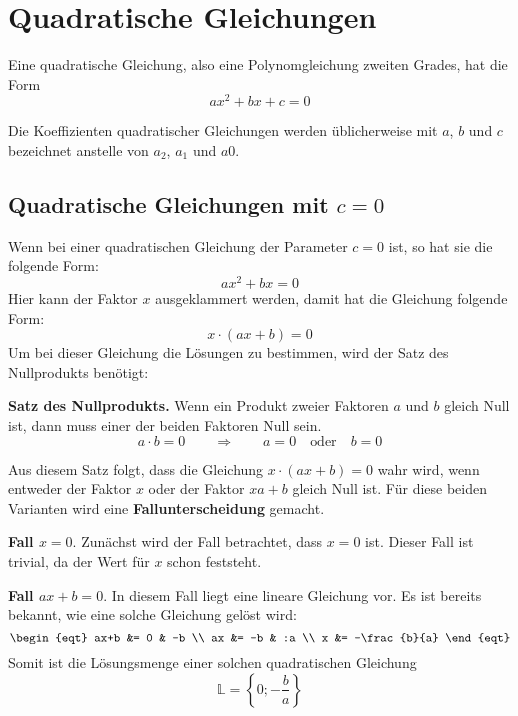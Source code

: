 \newpage
\section{Quadratische Gleichungen}

Eine quadratische Gleichung, also eine Polynomgleichung zweiten Grades, hat die Form
\[
  ax^{2}+bx+c = 0
\]

Die Koeffizienten quadratischer Gleichungen werden üblicherweise mit $a$, $b$ und $c$ bezeichnet anstelle von $a_{2}$, $a_{1}$ und $a{0}$.

\subsection{Quadratische Gleichungen mit $c=0$}

Wenn bei einer quadratischen Gleichung der Parameter $c = 0$ ist, so hat sie die folgende Form:
\[
  ax^{2} + bx = 0
\]
Hier kann der Faktor $x$ ausgeklammert werden, damit hat die Gleichung folgende Form:
\[
  x\cdot(ax+b) = 0
\]
Um bei dieser Gleichung die Lösungen zu bestimmen, wird der Satz des Nullprodukts benötigt:

\begin{theorem}
  \textbf{Satz des Nullprodukts.} Wenn ein Produkt zweier Faktoren $a$ und $b$ gleich Null ist, dann muss einer der beiden Faktoren Null sein.
  \[
    a\cdot b = 0 \qquad\Rightarrow\qquad a = 0 \quad\text{oder}\quad b = 0
  \]
\end{theorem}

Aus diesem Satz folgt, dass die Gleichung $x\cdot(ax+b) = 0$ wahr wird, wenn entweder der Faktor $x$ oder der Faktor $xa+b$ gleich Null ist. Für diese beiden Varianten wird eine \textbf{Fallunterscheidung} gemacht.

\textbf{Fall $x = 0$}. Zunächst wird der Fall betrachtet, dass $x = 0$ ist. Dieser Fall ist trivial, da der Wert für $x$ schon feststeht.

\textbf{Fall $ax+b = 0$}. In diesem Fall liegt eine lineare Gleichung vor. Es ist bereits bekannt, wie eine solche Gleichung gelöst wird:
\[\begin{eqt}
  ax+b &= 0            & -b \\
    ax &= -b           & :a \\
     x &= -\frac{b}{a}
\end{eqt}\]
Somit ist die Lösungsmenge einer solchen quadratischen Gleichung
\[
  \mathbb{L} = \left\{0;-\frac{b}{a}\right\}
\]

